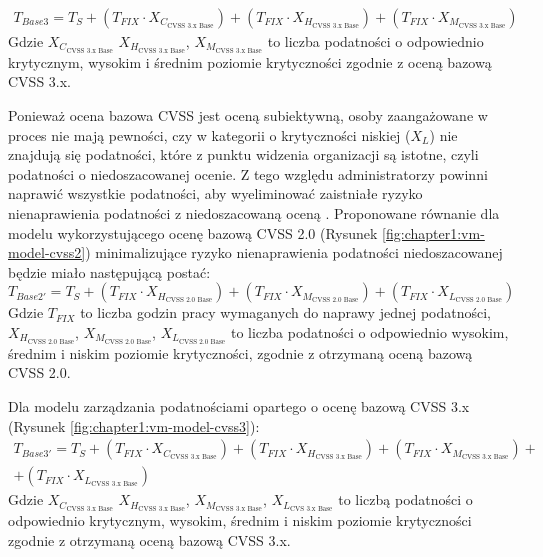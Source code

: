 \bigbreak
\begin{multline}
\label{eq:cvss3}
T_{Base3} = T_S + (T_{FIX} \cdot X_{C_\text{CVSS 3.x Base}}) + (T_{FIX} \cdot X_{H_\text{CVSS 3.x Base}}) + (T_{FIX} \cdot X_{M_\text{CVSS 3.x Base}}) 
\end{multline}
Gdzie $X_{C_\text{CVSS 3.x Base}}$ $X_{H_\text{CVSS 3.x Base}}$, $X_{M_\text{CVSS 3.x Base}}$ to liczba podatności o odpowiednio krytycznym, wysokim i średnim poziomie krytyczności zgodnie z oceną bazową CVSS 3.x.

\bigbreak
Ponieważ ocena bazowa CVSS jest oceną subiektywną, osoby zaangażowane w proces nie mają pewności, czy w kategorii o krytyczności niskiej ($X_L$) nie znajdują się podatności, które z punktu widzenia organizacji są istotne, czyli podatności o niedoszacowanej ocenie. Z tego względu administratorzy powinni naprawić wszystkie podatności, aby wyeliminować zaistniałe ryzyko nienaprawienia podatności z niedoszacowaną oceną \cite{gallon2010impact, li2015study}. Proponowane równanie dla modelu wykorzystującego ocenę bazową CVSS 2.0 (Rysunek \ref{fig:chapter1:vm-model-cvss2}) minimalizujące ryzyko nienaprawienia podatności niedoszacowanej będzie miało następującą postać:
\begin{equation}
\label{eq:cvss2prim}
T_{Base2'} = T_S + (T_{FIX} \cdot X_{H_\text{CVSS 2.0 Base}}) + (T_{FIX} \cdot X_{M_\text{CVSS 2.0 Base}}) + (T_{FIX} \cdot X_{L_\text{CVSS 2.0 Base}})
\end{equation}
Gdzie $T_{FIX}$ to liczba godzin pracy wymaganych do naprawy jednej podatności, $X_{H_\text{CVSS 2.0 Base}}$, $X_{M_\text{CVSS 2.0 Base}}$, $X_{ L_\text{CVSS 2.0 Base}}$ to liczba podatności o odpowiednio wysokim, średnim i niskim poziomie krytyczności, zgodnie z otrzymaną oceną bazową CVSS 2.0.

\bigbreak
Dla modelu zarządzania podatnościami opartego o ocenę bazową CVSS 3.x (Rysunek \ref{fig:chapter1:vm-model-cvss3}):
\begin{multline}
\label{eq:cvss3prim}
T_{Base3'} = T_S + (T_{FIX} \cdot X_{C_\text{CVSS 3.x Base}}) + (T_{FIX} \cdot X_{H_\text{CVSS 3.x Base}}) + (T_{FIX} \cdot X_{M_\text{CVSS 3.x Base}}) + \\
+ (T_{FIX} \cdot X_{L_\text{CVSS 3.x Base}})
\end{multline}
Gdzie $X_{C_\text{CVSS 3.x Base}}$ $X_{H_\text{CVSS 3.x Base}}$, $X_{M_\text{CVSS 3.x Base}}$, $X_ {L_\text{CVS 3.x Base}}$ to liczbą podatności o odpowiednio krytycznym, wysokim, średnim i niskim poziomie krytyczności zgodnie z otrzymaną oceną bazową CVSS 3.x.

